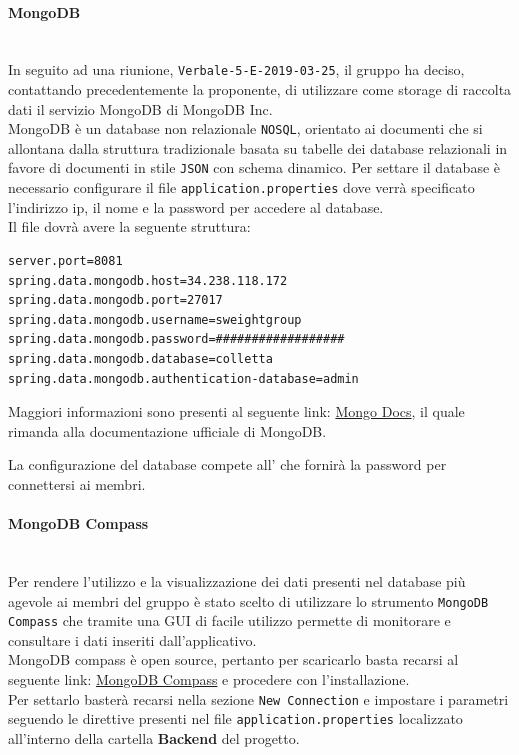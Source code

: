 \paragraph{MongoDB}\mbox{}\\
In seguito ad una riunione, \texttt{Verbale-5-E-2019-03-25}, il gruppo ha deciso, contattando precedentemente la proponente, di utilizzare come storage di raccolta dati il servizio MongoDB di MongoDB Inc.\\
MongoDB è un database non relazionale \texttt{NOSQL}, orientato ai documenti che si allontana dalla struttura tradizionale basata su tabelle dei database relazionali in favore di documenti in stile \texttt{JSON} con schema dinamico. 
Per settare il database è necessario configurare il file \texttt{application.properties} dove verrà specificato l'indirizzo ip, il nome e la password per accedere al database.\\
Il file dovrà avere la seguente struttura: 
\begin{lstlisting}[frame=single] 
server.port=8081
spring.data.mongodb.host=34.238.118.172
spring.data.mongodb.port=27017
spring.data.mongodb.username=sweightgroup
spring.data.mongodb.password=##################
spring.data.mongodb.database=colletta
spring.data.mongodb.authentication-database=admin
\end{lstlisting}
Maggiori informazioni sono presenti al seguente link: \href{https://docs.mongodb.com/?_ga=2.183391522.509639120.1554133474-1194492321.1550924275}{Mongo Docs}, il quale rimanda alla documentazione ufficiale di MongoDB. 

La configurazione del database compete all'\adm{} che fornirà la password per connettersi ai membri.

\paragraph{MongoDB Compass}\mbox{}\\
Per rendere l'utilizzo e la visualizzazione dei dati presenti nel database più agevole ai membri del gruppo è stato scelto di utilizzare lo strumento \texttt{MongoDB Compass} che tramite una {GUI} di facile utilizzo permette di monitorare e consultare i dati inseriti dall'applicativo.\\
MongoDB compass è open source, pertanto per scaricarlo basta recarsi al seguente link: \href{https://www.mongodb.com/products/compass}{MongoDB Compass} e procedere con l'installazione.\\
Per settarlo basterà recarsi nella sezione \texttt{New  Connection} e impostare i parametri seguendo le direttive presenti nel file \texttt{application.properties} localizzato all'interno della cartella \textbf{Backend} del progetto.

